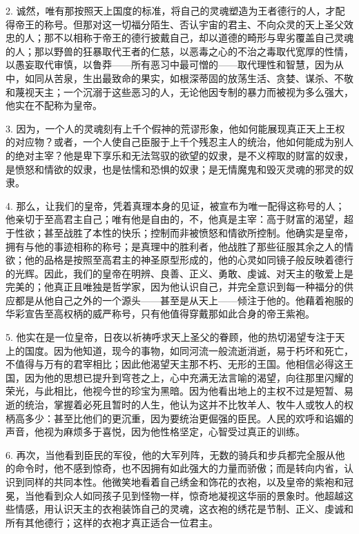 2. 诚然，唯有那按照天上国度的标准，将自己的灵魂塑造为王者德行的人，才配得帝王的称号。但那对这一切福分陌生、否认宇宙的君主、不向众灵的天上圣父效忠的人；那不以相称于帝王的德行披戴自己，却以道德的畸形与卑劣覆盖自己灵魂的人；那以野兽的狂暴取代王者的仁慈，以恶毒之心的不治之毒取代宽厚的性情，以愚妄取代审慎，以鲁莽——所有恶习中最可憎的——取代理性和智慧，因为从中，如同从苦泉，生出最致命的果实，如根深蒂固的放荡生活、贪婪、谋杀、不敬和蔑视天主；一个沉溺于这些恶习的人，无论他因专制的暴力而被视为多么强大，他实在不配称为皇帝。\par

3. 因为，一个人的灵魂刻有上千个假神的荒谬形象，他如何能展现真正天上王权的对应物？或者，一个人使自己臣服于上千个残忍主人的统治，他如何能成为别人的绝对主宰？他是卑下享乐和无法驾驭的欲望的奴隶，是不义榨取的财富的奴隶，是愤怒和情欲的奴隶，也是怯懦和恐惧的奴隶；是无情魔鬼和毁灭灵魂的邪灵的奴隶。\par

4. 那么，让我们的皇帝，凭着真理本身的见证，被宣布为唯一配得这称号的人；他亲切于至高君主自己；唯有他是自由的，不，他真是主宰：高于财富的渴望，超于性欲；甚至战胜了本性的快乐；控制而非被愤怒和情欲所控制。他确实是皇帝，拥有与他的事迹相称的称号；是真理中的胜利者，他战胜了那些征服其余之人的情欲；他的品格是按照至高君主的神圣原型形成的，他的心灵如同镜子般反映着德行的光辉。因此，我们的皇帝在明辨、良善、正义、勇敢、虔诚、对天主的敬爱上是完美的；他真正且唯独是哲学家，因为他认识自己，并完全意识到每一种福分的供应都是从他自己之外的一个源头——甚至是从天上——倾注于他的。他藉着袍服的华彩宣告至高权柄的威严称号，只有他值得穿戴那如此合身的帝王紫袍。\par

5. 他实在是一位皇帝，日夜以祈祷呼求天上圣父的眷顾，他的热切渴望专注于天上的国度。因为他知道，现今的事物，如同河流一般流逝消逝，易于朽坏和死亡，不值得与万有的君宰相比；因此他渴望天主那不朽、无形的王国。他相信必得这王国，因为他的思想已提升到穹苍之上，心中充满无法言喻的渴望，向往那里闪耀的荣光，与此相比，他视今世的珍宝为黑暗。因为他看出地上的主权不过是短暂、易逝的统治，掌握着必死且暂时的人生，他认为这并不比牧羊人、牧牛人或牧人的权柄高多少：甚至比他们的更沉重，因为要统治更倔强的臣民。人民的欢呼和谄媚的声音，他视为麻烦多于喜悦，因为他性格坚定，心智受过真正的训练。\par

6. 再次，当他看到臣民的军役，他的大军列阵，无数的骑兵和步兵都完全服从他的命令时，他不感到惊奇，也不因拥有如此强大的力量而骄傲；而是转向内省，认识到同样的共同本性。他微笑地看着自己绣金和饰花的衣袍，以及皇帝的紫袍和冠冕，当他看到众人如同孩子见到怪物一样，惊奇地凝视这华丽的景象时。他超越这些情感，用认识天主的衣袍装饰自己的灵魂，这衣袍的绣花是节制、正义、虔诚和所有其他德行；这样的衣袍才真正适合一位君主。\par

